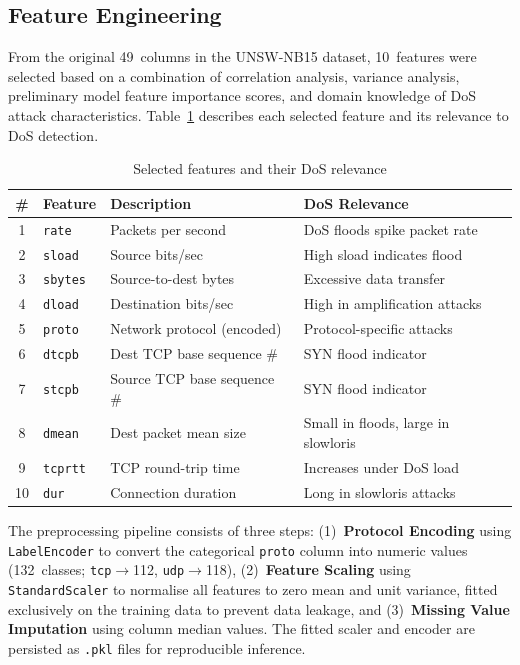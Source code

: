 \subsection{Feature Engineering}

From the original 49~columns in the UNSW-NB15 dataset, 10~features were selected based on a combination of correlation analysis, variance analysis, preliminary model feature importance scores, and domain knowledge of DoS attack characteristics. Table~\ref{tab:features} describes each selected feature and its relevance to DoS detection.

\begin{table}[htbp]
    \centering
    \caption{Selected features and their DoS relevance}
    \label{tab:features}
    \begin{tabular}{clll}
        \toprule
        \textbf{\#} & \textbf{Feature} & \textbf{Description} & \textbf{DoS Relevance} \\
        \midrule
        1  & \texttt{rate}   & Packets per second          & DoS floods spike packet rate \\
        2  & \texttt{sload}  & Source bits/sec              & High sload indicates flood \\
        3  & \texttt{sbytes} & Source-to-dest bytes         & Excessive data transfer \\
        4  & \texttt{dload}  & Destination bits/sec         & High in amplification attacks \\
        5  & \texttt{proto}  & Network protocol (encoded)   & Protocol-specific attacks \\
        6  & \texttt{dtcpb}  & Dest TCP base sequence \#    & SYN flood indicator \\
        7  & \texttt{stcpb}  & Source TCP base sequence \#   & SYN flood indicator \\
        8  & \texttt{dmean}  & Dest packet mean size        & Small in floods, large in slowloris \\
        9  & \texttt{tcprtt} & TCP round-trip time           & Increases under DoS load \\
        10 & \texttt{dur}    & Connection duration           & Long in slowloris attacks \\
        \bottomrule
    \end{tabular}
\end{table}

The preprocessing pipeline consists of three steps: (1)~\textbf{Protocol Encoding} using \texttt{LabelEncoder} to convert the categorical \texttt{proto} column into numeric values (132~classes; \texttt{tcp}$\rightarrow$112, \texttt{udp}$\rightarrow$118), (2)~\textbf{Feature Scaling} using \texttt{StandardScaler} to normalise all features to zero mean and unit variance, fitted exclusively on the training data to prevent data leakage, and (3)~\textbf{Missing Value Imputation} using column median values. The fitted scaler and encoder are persisted as \texttt{.pkl} files for reproducible inference.

